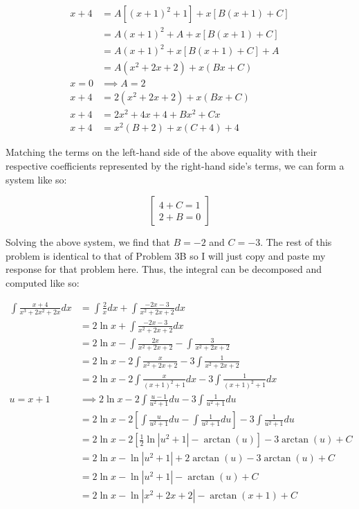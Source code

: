 \documentclass{article}
\begin{document}
    \begin{align*}
        x+4 &= A\left[\left(x+1\right)^2+1\right] + x\left[B(x+1)+C\right] \\
            &= A\left(x+1\right)^2 + A + x\left[B(x+1)+C\right] \\
            &= A\left(x+1\right)^2 + x\left[B(x+1)+C\right] + A \\
            &= A\left(x^2+2x+2\right) + x\left(Bx+C\right) \\
        x=0 &\implies A=2 \\
        x+4 &= 2\left(x^2+2x+2\right) + x\left(Bx+C\right) \\
        x+4 &= 2x^2 + 4x + 4 + Bx^2 + Cx \\
        x+4 &= x^2\left(B+2\right) + x\left(C+4\right) + 4
    \end{align*}

    Matching the terms on the left-hand side of the above equality with their respective coefficients represented by the right-hand side's terms, we can form a system like so:

    \[
        \begin{bmatrix}
            4 + C=1 \\
            2 + B = 0
        \end{bmatrix}
    \]

    Solving the above system, we find that $B=-2$ and $C=-3$. The rest of this problem is identical to that of Problem 3B so I will just copy and paste my response for that problem here. Thus, the integral can be
    decomposed and computed like so:

    \begin{align*}
        \int \frac{x+4}{x^3+2x^2+2x}dx  &= \int \frac{2}{x} dx + \int \frac{-2x-3}{x^2+2x+2}dx \\
        &= 2\ln{x} + \int \frac{-2x-3}{x^2+2x+2}dx \\
        &= 2\ln{x} - \int \frac{2x}{x^2+2x+2} - \int \frac{3}{x^2+2x+2} \\
        &= 2\ln{x} - 2\int\frac{x}{x^2+2x+2} - 3\int\frac{1}{x^2+2x+2} \\
        &= 2\ln{x} - 2\int \frac{x}{\left(x+1\right)^2 + 1}dx - 3\int\frac{1}{\left(x+1\right)^2+1}dx \\
        u = x+1                         &\implies 2\ln{x} - 2\int \frac{u-1}{u^2 + 1}du - 3\int \frac{1}{u^2+1}du \\
        &= 2\ln{x} - 2\left[\int \frac{u}{u^2+1}du-\int\frac{1}{u^2+1}du\right]-3\int\frac{1}{u^2+1}du \\
        &= 2\ln{x} - 2\left[\frac{1}{2}\ln{\left|u^2+1\right|}-\arctan{(u)}\right]-3\arctan{(u)} + C \\
        &= 2\ln{x} -\ln{\left|u^2+1\right|} + 2\arctan{(u)}-3\arctan{(u)} + C \\
        &= 2\ln{x} -\ln{\left|u^2+1\right|} -\arctan{(u)} + C \\
        &= 2\ln{x} - \ln{\left|x^2+2x+2\right|}-\arctan{(x+1)} + C
    \end{align*}
\end{document}
